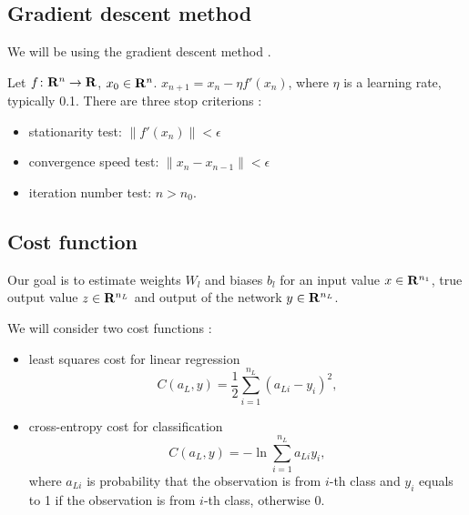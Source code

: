 \subsection{Gradient descent method}

We will be using the gradient descent method
\cite [section 10.8] {press-teukolsky-vetterling-flannery-2007}
\cite [section 7.3.3] {krzysko-wolynski-gorecki-skorzybut-2008}
\cite [section 1.2, page 7, section 3.2.8] {aggarwal-2018}
\cite [section 4.3, eq. (4.5)] {goodfellow-etal-2018}.

Let $f \colon \mathbf{R}^n \rightarrow \mathbf{R}$, $x_0 \in \mathbf{R}^n$. $x_{n
  + 1} = x_n - \eta f'(x_n)$, where $\eta$ is a learning rate,
typically 0.1. There are three stop criterions \cite [pages 222-223]
{krzysko-wolynski-gorecki-skorzybut-2008}:
\begin{itemize}
\item stationarity test: $\|f'(x_n)\| < \epsilon$
\item convergence speed test: $\|x_n - x_{n - 1}\| < \epsilon$
\item iteration number test: $n > n_0$.
\end{itemize}

\subsection{Cost function}

Our goal is to estimate weights $W_l$ and biases $b_l$ for an input
value $x \in \mathbf{R}^{n_1}$, true output value $z \in \mathbf{R}^{n_L}$ and
output of the network $y \in \mathbf{R}^{n_L}$.

We will consider two cost functions \cite [section 1.2.1.5]
{aggarwal-2018} \cite [section 7.3.1]
{krzysko-wolynski-gorecki-skorzybut-2008}:
\begin{itemize}
\item least squares cost for linear regression
  \begin{equation} \label{eq:least_squares_cost}
    C(a_L, y) = \frac{1}{2} \sum_{i = 1}^{n_L} (a_{Li} - y_i)^2,
  \end{equation}
\item cross-entropy cost for classification
  \begin{equation} \label{eq:cross_entropy_cost}
    C(a_L, y) = - \ln \sum_{i = 1}^{n_L} a_{Li}y_i,
  \end{equation}
  where $a_{Li}$ is probability that the observation is from $i$-th
  class and $y_{i}$ equals to 1 if the observation is from $i$-th
  class, otherwise 0.
\end{itemize}

